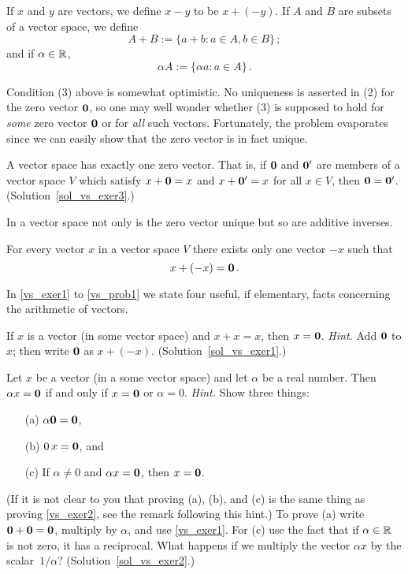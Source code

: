 If $x$ and $y$ are vectors, we define $x - y$ to be $x + (-y)$.  If $A$ and $B$ are subsets of
a vector space, we define
 \[ A + B := \{a + b \colon  a \in A, b \in B\}\,; \]
and if $\alpha \in \mathbb{R}$,
  \[ \alpha A  :=  \{\alpha a \colon a \in A\}\,. \]

Condition (3) above is somewhat optimistic.  No uniqueness is asserted in (2) for the zero
vector $\mathbf{0}$, so one may well wonder whether (3) is supposed to hold for \emph{some} zero
vector $\mathbf{0}$ or for \emph{all} such vectors.  Fortunately, the problem evaporates since we
can easily show that the zero vector is in fact unique.

\begin{exer}\label{vs_exer3} A vector space has exactly one zero vector.  That is, if $\mathbf{0}$
and $\mathbf{0}'$ are members of a vector space $V$ which satisfy $x + \mathbf{0} = x$ and $x + \mathbf{0}' =
x$ for all $x \in V$, then $\mathbf{0} = \mathbf{0}'$. (Solution~\ref{sol_vs_exer3}.)

\end{exer}

In a vector space not only is the zero vector unique but so are additive inverses.

\begin{prob}\label{vs_prob2} For every vector $x$ in a vector space $V$ there exists only one
vector $-x$ such that
 \[ x + (-x) = \mathbf{0}\,. \]
\end{prob}

In \ref{vs_exer1} to \ref{vs_prob1} we state four useful, if elementary, facts concerning the
arithmetic of vectors.

\begin{exer}\label{vs_exer1} If $x$ is a vector (in some vector space) and $x + x = x$, then
$x = \mathbf{0}$. \emph{Hint.}  Add $\mathbf{0}$ to $x$; then write $\mathbf{0}$ as $x + (-x)$.
(Solution~\ref{sol_vs_exer1}.)
\end{exer}

\begin{exer}\label{vs_exer2} Let $x$ be a vector (in a some vector space) and let $\alpha$ be a
real number.  Then $\alpha x = \mathbf{0}$ if and only if $x = \mathbf{0}$ or $\alpha = 0$.
\emph{Hint.} Show three things:
 \begin{enumerate}
  \item[(a)] $\alpha \mathbf{0} = \mathbf{0}$,
  \item[(b)] $0\,x = \mathbf{0}$, and
  \item[(c)] If $\alpha \ne 0$ and $\alpha x = \mathbf{0}$, then $x = \mathbf{0}$.
 \end{enumerate} (If it is not clear to you that proving (a), (b), and (c) is the same thing as
proving \ref{vs_exer2}, see the remark following this hint.)  To prove (a) write $\mathbf{0} +
\mathbf{0} = \mathbf{0}$, multiply by $\alpha$, and use \ref{vs_exer1}.  For (c) use the fact that
if $\alpha \in \mathbb{R}$ is not zero, it has a reciprocal.  What happens if we multiply the
vector $\alpha x$ by the scalar~$1/\alpha$?  (Solution~\ref{sol_vs_exer2}.)
\end{exer}

